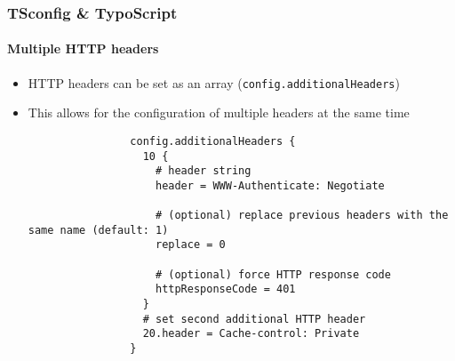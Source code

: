 
\begin{frame}[fragile]
	\frametitle{TSconfig \& TypoScript}
	\framesubtitle{Multiple HTTP headers}

	\begin{itemize}

		\item HTTP headers can be set as an array (\small\texttt{config.additionalHeaders}\normalsize)
		\item This allows for the configuration of multiple headers at the same time

			\begin{lstlisting}
				config.additionalHeaders {
				  10 {
				    # header string
				    header = WWW-Authenticate: Negotiate

				    # (optional) replace previous headers with the same name (default: 1)
				    replace = 0

				    # (optional) force HTTP response code
				    httpResponseCode = 401
				  }
				  # set second additional HTTP header
				  20.header = Cache-control: Private
				}
			\end{lstlisting}

	\end{itemize}

\end{frame}


